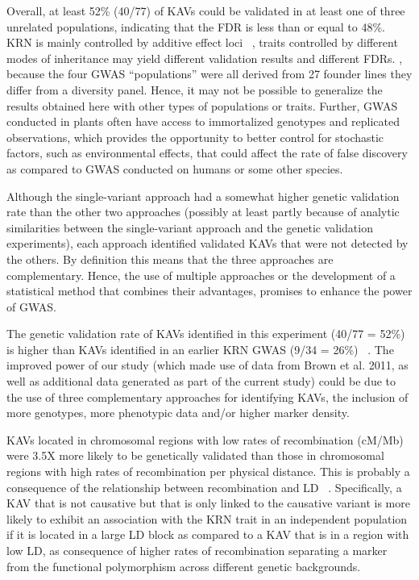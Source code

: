 \documentclass[10pt,letterpaper]{article}
\begin{document}
Overall, at least 52\% (40/77) of KAVs could be validated in at least one of three unrelated populations, indicating that the FDR is less than or equal to 48\%. 
\DIFdelbegin {}\DIFdelend \DIFaddbegin {}\DIFaddend KRN is mainly controlled by additive effect loci ~\cite{Brown2011, Lu2011}, traits controlled by different modes of inheritance may yield different validation results and different FDRs.  \DIFdelbegin {}\DIFdelend \DIFaddbegin {}\DIFaddend , because the four GWAS “populations” were all derived from 27 founder lines they differ from a diversity panel. Hence, it may not be possible to generalize the results obtained here with other types of populations or traits. Further, GWAS conducted in plants often have access to immortalized genotypes and replicated observations, which provides the opportunity to better control for stochastic factors, such as environmental effects, that could affect the rate of false discovery as compared to GWAS conducted on humans or some other species.

Although the single-variant approach had a somewhat higher genetic validation rate than the other two approaches (possibly at least partly because of analytic similarities between the single-variant approach and the genetic validation experiments), each approach identified validated KAVs that were not detected by the others. By definition this means that the three approaches are complementary. Hence, the use of multiple approaches or the development of a statistical method that combines their advantages, promises to enhance the power of GWAS. 

The genetic validation rate of KAVs identified in this experiment (40/77 = 52\%) is higher than KAVs identified in an earlier KRN GWAS (9/34 = 26\%) ~\cite{Brown2011}. The improved power of our study (which made use of data from Brown et al. 2011, as well as additional data generated as part of the current study) could be due to the use of three complementary approaches for identifying KAVs, the inclusion of more genotypes, more phenotypic data and/or higher marker density. 

KAVs located in chromosomal regions with low rates of recombination (cM/Mb) were 3.5X more likely to be genetically validated than those in chromosomal regions with high rates of recombination per physical distance. This is probably a consequence of the relationship between recombination and LD ~\cite{Kim2007}. Specifically, a KAV that is not causative but that is only linked to the causative variant is more likely to exhibit an association with the KRN trait in an independent population if it is located in a large LD block as compared to a KAV that is in a region with low LD, as consequence of higher rates of recombination separating a marker from the functional polymorphism across different genetic backgrounds.
\end{document}
